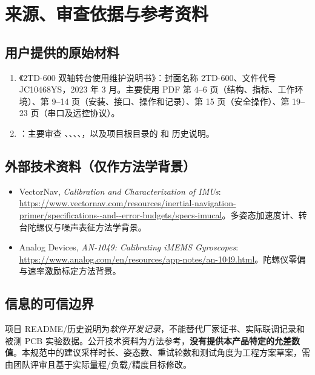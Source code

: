\chapter{来源、审查依据与参考资料}
\section{用户提供的原始材料}
\begin{enumerate}
\item 《2TD-600 双轴转台使用维护说明书》：封面名称 2TD-600、文件代号 JC10468YS，2023 年 3 月。主要使用 PDF 第 4--6 页（结构、指标、工作环境）、第 9--14 页（安装、接口、操作和记录）、第 15 页（安全操作）、第 19--23 页（串口及远控协议）。
\item {}：主要审查 、、、、，以及项目根目录的  和  历史说明。
\end{enumerate}
\section{外部技术资料（仅作方法学背景）}
\begin{itemize}
\item VectorNav, \emph{Calibration and Characterization of IMUs}: \url{https://www.vectornav.com/resources/inertial-navigation-primer/specifications--and--error-budgets/specs-imucal}。多姿态加速度计、转台陀螺仪与噪声表征方法学背景。
\item Analog Devices, \emph{AN-1049: Calibrating iMEMS Gyroscopes}: \url{https://www.analog.com/en/resources/app-notes/an-1049.html}。陀螺仪零偏与速率激励标定方法背景。
\end{itemize}
\section{信息的可信边界}
项目 README/历史说明为\emph{软件开发记录}，不能替代厂家证书、实际联调记录和被测 PCB 实验数据。公开技术资料为方法参考，\textbf{没有提供本产品特定的允差数值}。本规范中的建议采样时长、姿态数、重试轮数和测试角度为工程方案草案，需由团队评审且基于实际量程/负载/精度目标修改。
